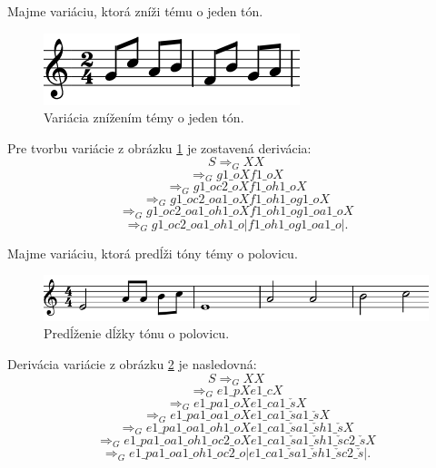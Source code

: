 \begin{example}
Majme variáciu, ktorá zníži tému o jeden tón.
\begin{figure}[H]
    \centering
    \includegraphics[scale=0.4]{thesis/obrazky-figures/seqdown.png}
    \caption{Variácia znížením témy o jeden tón.}
    \label{fig:znizenievar}
    \end{figure}
    Pre tvorbu variácie z obrázku \ref{fig:znizenievar} je zostavená derivácia:
    $$ S \Rightarrow_G XX $$
    $$\Rightarrow_G  g1\_oXf1\_oX$$
    $$\Rightarrow_G  g1\_oc2\_oXf1\_oh1\_oX$$
    $$\Rightarrow_G  g1\_oc2\_oa1\_oXf1\_oh1\_og1\_oX$$
    $$\Rightarrow_G  g1\_oc2\_oa1\_oh1\_oXf1\_oh1\_og1\_oa1\_oX$$
    $$\Rightarrow_G  g1\_oc2\_oa1\_oh1\_o|f1\_oh1\_og1\_oa1\_o|.$$
\end{example}

\begin{example}
Majme variáciu, ktorá predĺži tóny témy o polovicu.
\begin{figure}[H]
    \centering
    \includegraphics[scale=0.4]{thesis/obrazky-figures/augvar.png}
    \caption{Predĺženie dĺžky tónu o polovicu.}
    \label{fig:predlzenievar}
    \end{figure}
    Derivácia variácie z obrázku \ref{fig:predlzenievar} je nasledovná: 
    $$ S \Rightarrow_G XX $$
    $$\Rightarrow_G e1\_pXe1\_cX $$
    $$\Rightarrow_G e1\_pa1\_oXe1\_ca1\_\check{s}X $$
    $$\Rightarrow_G e1\_pa1\_oa1\_oXe1\_ca1\_\check{s}a1\_\check{s}X $$
    $$\Rightarrow_G e1\_pa1\_oa1\_oh1\_oXe1\_ca1\_\check{s}a1\_\check{s}h1\_\check{s}X $$
    $$\Rightarrow_G e1\_pa1\_oa1\_oh1\_oc2\_oXe1\_ca1\_\check{s}a1\_\check{s}h1\_\check{s}c2\_\check{s}X $$
    $$\Rightarrow_G e1\_pa1\_oa1\_oh1\_oc2\_o|e1\_ca1\_\check{s}a1\_\check{s}h1\_\check{s}c2\_\check{s}|.$$
\end{example}

